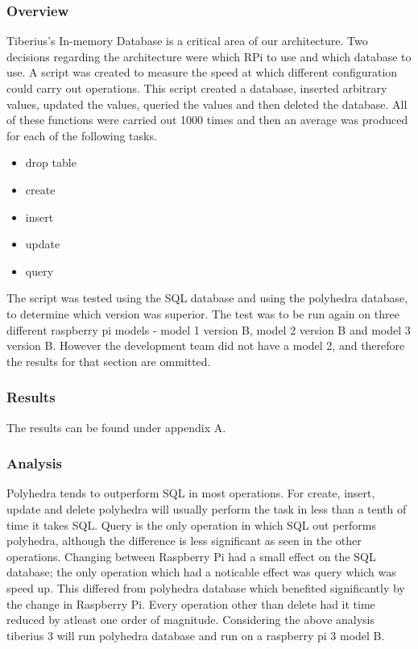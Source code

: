 \subsubsection{Overview}
Tiberius's In-memory Database is a critical area of our architecture. Two decisions regarding the architecture were which RPi to use and which database to use. A script was created to measure the speed at which different configuration could carry out operations. This script created a database, inserted arbitrary values, updated the values, queried the  values and then deleted the database. All of these functions were carried out 1000 times and then an average was produced for each of the following tasks.
\begin{itemize}
\item drop table
\item create
\item insert
\item update
\item query
\end{itemize}

The script was tested using the SQL database and using the polyhedra database, to determine which version was superior. The test was to be run again on three different raspberry pi models - model 1 version B, model 2 version B and model 3 version B. However the development team did not have a model 2, and therefore the results for that section are ommitted. 

\subsubsection{Results}
The results can be found under appendix A.

\subsubsection{Analysis}
Polyhedra tends to outperform SQL in most operations. For create, insert, update and delete polyhedra will usually perform the task in less than a tenth of time it takes SQL. Query is the only operation in which SQL out performs polyhedra, although the difference is less significant as seen in the other operations.
\newline
Changing between Raspberry Pi had a small effect on the SQL database; the only operation which had a noticable effect was query which was speed up. This differed from polyhedra database which benefited significantly by the change in Raspberry Pi. Every operation other than delete had it time reduced by atleast one order of magnitude.
\newline
Considering the above analysis tiberius 3 will run polyhedra database and run on a raspberry pi 3 model B. 



















